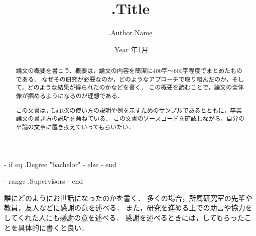 \documentclass[12pt,twoside]{jsbook}
\begin{document}
\title{ {{ .Title }} }

{{- if eq .Degree "bachelor" }}
{{- else }}
{{- end }}

\author{ {{ .Author.Name }} }

\date{ {{ .Year }} 年1月}




{{- range .Supervisors }}
{{- end }}

\maketitle


\begin{abstract}
    論文の概要を書こう．概要は，論文の内容を簡潔に400字〜600字程度でまとめたものである．
    なぜその研究が必要なのか，どのようなアプローチで取り組んだのか，そして，どのような結果が得られたのかなどを書く．
    この概要を読むことで，論文の全体像が掴めるようになるのが理想である．

    この文書は，\LaTeX の使い方の説明や例を示すためのサンプルであるとともに，卒業論文の書き方の説明を兼ねている．
    この文書のソースコードを確認しながら，自分の卒論の文章に置き換えていってもらいたい．
\end{abstract}

\begin{acknowledgments}
誰にどのようにお世話になったのかを書く．
多くの場合，所属研究室の先輩や教員，友人などに感謝の意を述べる．
また，研究を進める上での助言や協力をしてくれた人にも感謝の意を述べる．
感謝を述べるときには，してもらったことを具体的に書くと良い．
\end{acknowledgments}


\tableofcontents       %

%
%
\end{document}
